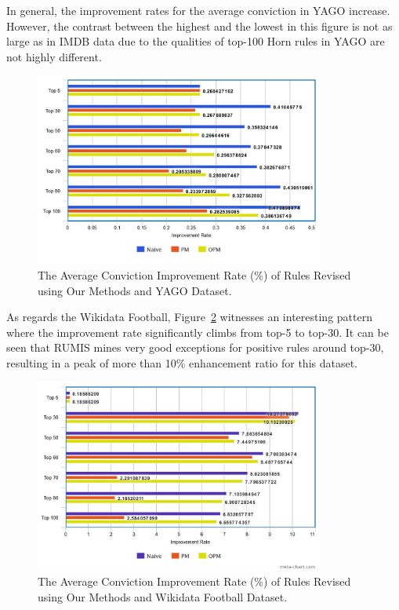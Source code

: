 In general, the improvement rates for the average conviction in YAGO increase. However, the contrast between the highest and the lowest in this figure is not as large as in IMDB data due to the qualities of top-100 Horn rules in YAGO are not highly different.

\begin{figure}[ht]
\centering
\includegraphics[width=0.85\textwidth]{figures/table_1_5_yago.jpeg}
\caption{The Average Conviction Improvement Rate (\%) of Rules Revised using Our Methods and YAGO Dataset.}
\label{fig_1_5_yago}
\end{figure}

As regards the Wikidata Football, Figure~\ref{fig_1_5_wikidata} witnesses an interesting pattern where the improvement rate significantly climbs from top-5 to top-30. It can be seen that RUMIS mines very good exceptions for positive rules around top-30, 
resulting in a peak of more than 10\% enhancement ratio for this dataset.

\begin{figure}[ht]
\centering
\includegraphics[width=0.85\textwidth]{figures/table_1_5_wikidata.jpeg}
\caption{The Average Conviction Improvement Rate (\%) of Rules Revised using Our Methods and Wikidata Football Dataset.}
\label{fig_1_5_wikidata}
\end{figure}

